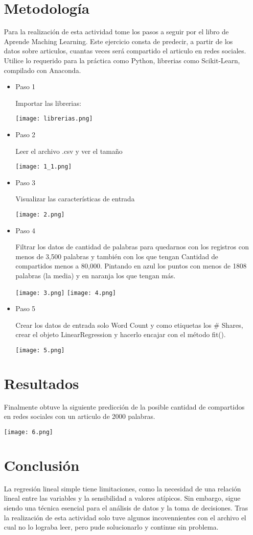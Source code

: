 \documentclass{article}
\begin{document}
\section{Metodología}
Para la realización de esta actividad tome los pasos a seguir por el libro de Aprende Maching Learning.
Este ejercicio consta de predecir, a partir de los datos sobre articulos, cuantas veces será compartido el articulo en redes sociales.
Utilice lo requerido para la práctica como Python, librerias como Scikit-Learn, compilado con Anaconda.
\begin{itemize}
\item Paso 1

Importar las librerias:

\texttt{[image: librerias.png]}
\item Paso 2

Leer el archivo .csv y ver el tamaño

\texttt{[image: 1\_1.png]}

\item Paso 3

Visualizar las características de entrada

\texttt{[image: 2.png]}

\item Paso 4

Filtrar los datos de cantidad de palabras para quedarnos con los registros con menos de 3,500 palabras y también con los que tengan Cantidad de compartidos menos a 80,000. Pintando en azul los
 puntos con menos de 1808 palabras (la media) y en naranja los que tengan más.

\texttt{[image: 3.png]}
\texttt{[image: 4.png]}
\item Paso 5

Crear los datos de entrada solo Word Count y como etiquetas los \# Shares, crear el objeto LinearRegression y hacerlo encajar con el método fit().

\texttt{[image: 5.png]}

\end{itemize}

\section{Resultados}

Finalmente obtuve la siguiente predicción de la posible cantidad de compartidos en redes sociales con un articulo de 2000 palabras.

\texttt{[image: 6.png]}

\section{Conclusión}

La regresión lineal simple tiene limitaciones, como la necesidad de una relación lineal entre las variables y la sensibilidad a valores atípicos. Sin embargo, sigue siendo una técnica esencial para el análisis de datos y la toma de decisiones.
Tras la realización de esta actividad solo tuve algunos incovennientes con el archivo el cual no lo lograba leer, pero pude solucionarlo y continue sin problema.
\end{document}
